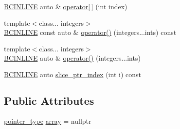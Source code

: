 \begin{DoxyCompactItemize}
\item 
\hyperlink{BlackCat__Common_8h_a6699e8b0449da5c0fafb878e59c1d4b1}{B\+C\+I\+N\+L\+I\+NE} auto \& \hyperlink{structBC_1_1tensors_1_1exprs_1_1Kernel__Array_a5e544eefd274b6d085fc47982d250a3c}{operator\mbox{[}$\,$\mbox{]}} (int index)
\item 
{\footnotesize template$<$class... integers$>$ }\\\hyperlink{BlackCat__Common_8h_a6699e8b0449da5c0fafb878e59c1d4b1}{B\+C\+I\+N\+L\+I\+NE} const auto \& \hyperlink{structBC_1_1tensors_1_1exprs_1_1Kernel__Array_ade61f92b424558aa183b4e7ad969993d}{operator()} (integers...\+ints) const 
\item 
{\footnotesize template$<$class... integers$>$ }\\\hyperlink{BlackCat__Common_8h_a6699e8b0449da5c0fafb878e59c1d4b1}{B\+C\+I\+N\+L\+I\+NE} auto \& \hyperlink{structBC_1_1tensors_1_1exprs_1_1Kernel__Array_a769ff95625b5c677184106a90592da00}{operator()} (integers...\+ints)
\item 
\hyperlink{BlackCat__Common_8h_a6699e8b0449da5c0fafb878e59c1d4b1}{B\+C\+I\+N\+L\+I\+NE} auto \hyperlink{structBC_1_1tensors_1_1exprs_1_1Kernel__Array_aaba311230962ca73d7838d64490b2c32}{slice\+\_\+ptr\+\_\+index} (int i) const 
\end{DoxyCompactItemize}
\subsection*{Public Attributes}
\begin{DoxyCompactItemize}
\item 
\hyperlink{structBC_1_1tensors_1_1exprs_1_1Kernel__Array_a63f8901ef5aa43d1aaa33698e5b2bcce}{pointer\+\_\+type} \hyperlink{structBC_1_1tensors_1_1exprs_1_1Kernel__Array_ac26e7c76269897b0da1008f43a84c721}{array} = nullptr
\end{DoxyCompactItemize}
